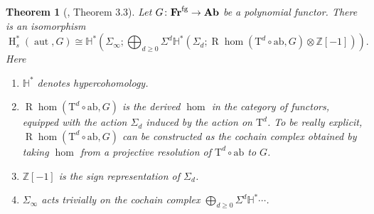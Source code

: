 \documentclass[psamsfonts]{amsart}
\theoremstyle{plain}
\newtheorem{thm}{Theorem}[section]
\theoremstyle{definition}
\theoremstyle{remark}
\newcommand{\Z}{\mathbb{Z}}
\newcommand{\catname}[1]{{\normalfont\textbf{#1}}}
\newcommand{\fr}{\allfr^{\mathrm{fg}}}
\newcommand{\allfr}{\catname{Fr}}
\newcommand{\ab}{\catname{Ab}}
\newcommand{\ch}{\catname{Ch}}
\newcommand{\aut}{\operatorname{aut}}
\newcommand{\classifying}{\operatorname{B}}
\newcommand{\HH}{\operatorname{H}} %
\newcommand{\abelianization}{\mathrm{ab}}
\newcommand{\tensor}{\mathrm{T}}
\DeclareMathOperator{\ext}{Ext}
\DeclareMathOperator{\nat}{Nat}
\DeclareMathOperator{\spectralNat}{\underline{\underline{\nat}}}
\DeclareMathOperator{\fun}{Fun}
\begin{document}
\begin{thm}[\cite{Djament2019}, Theorem 3.3]\label{thm:Djament}
Let $G\colon \fr \to \ab$ be a polynomial functor. There is an isomorphism
\[
\HH^*_s(\aut, G)\cong \mathbb H^*\left(\Sigma_\infty; \bigoplus_{d\ge 0} \Sigma^d\mathbb H^*\left(\Sigma_d; \operatorname{R}\hom(\tensor^d \circ \abelianization, G)\otimes \mathbb Z[-1]\right)\right).
\]
Here \begin{enumerate}
\item $\mathbb H^*$ denotes hypercohomology.
\item $\operatorname{R}\hom(\tensor^d \circ \abelianization, G)$ is the derived $\hom$ in the category of functors, equipped with the action $\Sigma_d$ induced by the action on $\tensor^d$. To be really explicit, $\operatorname{R}\hom(\tensor^d \circ \abelianization, G)$ can be constructed as the cochain complex obtained by taking $\hom$ from a projective resolution of $\tensor^d \circ \abelianization$ to $G$.
\item $\Z[-1]$ is the sign representation of $\Sigma_d$.
\item $\Sigma_\infty$ acts trivially on the cochain complex $\bigoplus_{d\ge 0} \Sigma^d\mathbb H^* \cdots$. 
    
\end{enumerate}
\end{thm}
\end{document}
